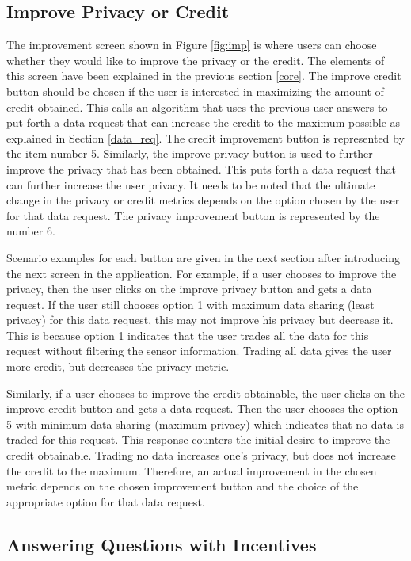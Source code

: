 \subsection{Improve Privacy or Credit}

The improvement screen shown in Figure \ref{fig:imp} is where users can choose whether they would like to improve the privacy or the credit. The elements of this screen have been explained in the previous section \ref{core}.
The improve credit button
should be chosen if the user is interested in maximizing the amount of credit obtained. This calls an algorithm that uses the previous user answers to
put forth a data request that can increase the credit to the maximum possible as explained in Section \ref{data_req}. The credit improvement button is represented by the item number 5. Similarly, the improve privacy button is used to further improve the privacy that has been obtained. This puts forth a data request that can further increase the user privacy. It needs to be noted that the ultimate change in the privacy or credit metrics depends on the option chosen by the user for that data request. The privacy improvement button is represented by the number 6.

Scenario examples for each button are given in the next section after introducing the next screen in the application. For example, if a user chooses to improve the privacy, then the user clicks on the improve privacy button and gets a data request. If the user still chooses option 1 with maximum data sharing (least privacy) for this data request, this may not improve his privacy but decrease it. This is because option 1 indicates that the user trades all the data for this request without filtering the sensor information. Trading all data gives the user more credit, but decreases the privacy metric.

Similarly, if a user chooses to improve the credit obtainable, the user clicks on the improve credit button and gets a data request. Then the user chooses the option 5 with minimum data sharing (maximum privacy) which indicates that no data is traded for this request. This response counters the initial desire to improve the credit obtainable. Trading no data increases one's privacy, but does not increase the credit to the maximum. Therefore, an actual improvement in the chosen metric depends on the chosen improvement button and the choice of the appropriate option for that data request.

\subsection{Answering Questions with Incentives}

